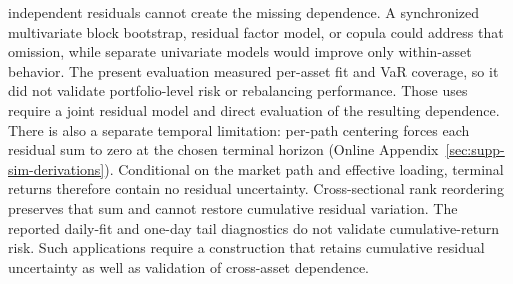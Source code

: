 independent residuals cannot create the missing dependence. A
synchronized multivariate block bootstrap, residual factor model, or
copula could address that omission, while separate univariate models
would improve only within-asset behavior. The present evaluation
measured per-asset fit and VaR coverage, so it did not validate
portfolio-level risk or rebalancing performance. Those uses require a
joint residual model and direct evaluation of the resulting dependence.
There is also a separate temporal limitation: per-path centering
forces each residual sum to zero at the chosen terminal horizon
(Online Appendix~\ref{sec:supp-sim-derivations}). Conditional on the
market path and effective loading, terminal returns therefore contain
no residual uncertainty. Cross-sectional rank reordering preserves
that sum and cannot restore cumulative residual variation. The
reported daily-fit and one-day tail diagnostics do not validate
cumulative-return risk. Such applications require a construction that
retains cumulative residual uncertainty as well as validation of
cross-asset dependence.
